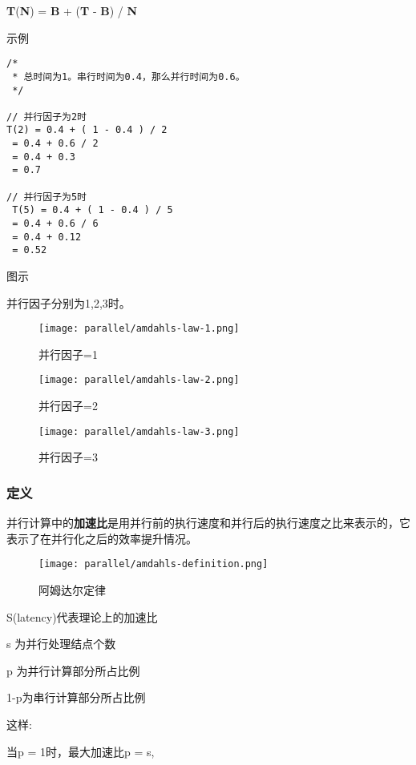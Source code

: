 \textbf{T}(\textbf{N}) = \textbf{B} + (\textbf{T} - \textbf{B}) / \textbf{N}



示例

\begin{lstlisting}
/*
 * 总时间为1。串行时间为0.4，那么并行时间为0.6。
 */

// 并行因子为2时
T(2) = 0.4 + ( 1 - 0.4 ) / 2
 = 0.4 + 0.6 / 2
 = 0.4 + 0.3
 = 0.7

// 并行因子为5时
 T(5) = 0.4 + ( 1 - 0.4 ) / 5
 = 0.4 + 0.6 / 6
 = 0.4 + 0.12
 = 0.52
\end{lstlisting}

图示

并行因子分别为1,2,3时。

\begin{figure}[H]
    \centering
    \texttt{[image: parallel/amdahls-law-1.png]}
    \caption{并行因子=1}
\end{figure}
\begin{figure}[H]
    \centering
    \texttt{[image: parallel/amdahls-law-2.png]}
    \caption{并行因子=2}
\end{figure}
\begin{figure}[H]
    \centering
    \texttt{[image: parallel/amdahls-law-3.png]}
    \caption{并行因子=3}
\end{figure}


\subsubsection{定义} 

并行计算中的\textbf{加速比}是用并行前的执行速度和并行后的执行速度之比来表示的，它表示了在并行化之后的效率提升情况。


 \begin{figure}[H]
    \centering
    \texttt{[image: parallel/amdahls-definition.png]}
    \caption{阿姆达尔定律}
\end{figure}

S(latency)代表理论上的加速比

s 为并行处理结点个数

p 为并行计算部分所占比例

1-p为串行计算部分所占比例

这样:

当p = 1时，最大加速比p = s,

